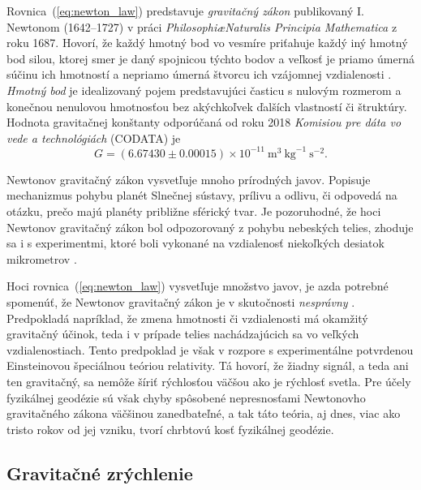 \documentclass[a4paper, 12pt]{book}
\begin{document}
Rovnica~(\ref{eq:newton_law}) predstavuje \emph{gravitačný zákon} 
publikovaný I. Newtonom (1642--1727) v práci \emph{Philosophi\ae Naturalis 
Principia Mathematica} z roku 1687.  Hovorí, že každý hmotný bod vo vesmíre 
priťahuje každý iný hmotný bod silou, ktorej smer je daný spojnicou týchto 
bodov a veľkosť je priamo úmerná súčinu ich hmotností a nepriamo úmerná štvorcu 
ich vzájomnej vzdialenosti \citep{Kellogg1967}.  \emph{Hmotný bod} je 
idealizovaný pojem predstavujúci časticu s nulovým rozmerom a konečnou 
nenulovou hmotnosťou bez akýchkoľvek ďalších vlastností či štruktúry.  Hodnota 
gravitačnej konštanty odporúčaná od roku 2018 \emph{Komisiou pre dáta vo vede 
a technológiách} (CODATA) je
%
\begin{equation}
G = (6.67430 \pm 0.00015) \times 10^{-11} \ \mathrm{m}^3 \ \mathrm{kg}^{-1} 
\ \mathrm{s}^{-2}{.}
\end{equation}

Newtonov gravitačný zákon vysvetľuje mnoho prírodných javov.  Popisuje 
mechanizmus pohybu planét Slnečnej sústavy, prílivu a odlivu, či odpovedá na 
otázku, prečo majú planéty približne sférický tvar.  Je pozoruhodné, že hoci 
Newtonov gravitačný zákon bol odpozorovaný z pohybu nebeských telies, zhoduje 
sa i s experimentmi, ktoré boli vykonané na vzdialenosť niekoľkých desiatok 
mikrometrov \citep{Lee2020}.

Hoci rovnica~(\ref{eq:newton_law}) vysvetľuje množstvo javov, je azda 
potrebné spomenúť, že Newtonov gravitačný zákon je v skutočnosti 
\emph{nesprávny} \citep{Feynman}.  Predpokladá napríklad, že zmena hmotnosti či 
vzdialenosti má okamžitý gravitačný účinok, teda i v prípade telies 
nachádzajúcich sa vo veľkých vzdialenostiach.  Tento predpoklad je však 
v rozpore s experimentálne potvrdenou Einsteinovou špeciálnou teóriou 
relativity.  Tá hovorí, že žiadny signál, a teda ani ten gravitačný, sa nemôže 
šíriť rýchlosťou väčšou ako je rýchlosť svetla.  Pre účely fyzikálnej geodézie 
sú však chyby spôsobené nepresnosťami Newtonovho gravitačného zákona väčšinou 
zanedbateľné, a tak táto teória, aj dnes, viac ako tristo rokov od jej vzniku, 
tvorí chrbtovú kosť fyzikálnej geodézie.

\subsection{Gravitačné zrýchlenie}
\label{sec:gg}
\end{document}

